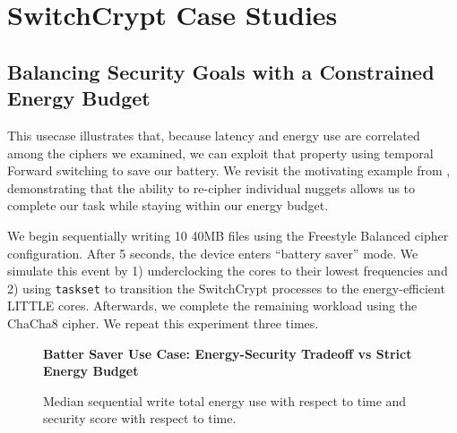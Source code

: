 \section{SwitchCrypt Case Studies}\label{sec:usecases}


\subsection{Balancing Security Goals with a Constrained Energy Budget}

This usecase illustrates that, because latency and energy use are correlated
among the ciphers we examined, we can exploit that property using temporal
Forward switching to save our battery. We revisit the motivating example from
, demonstrating that the ability to re-cipher individual
nuggets allows us to complete our task while staying within our energy budget.

We begin sequentially writing 10 40MB files using the Freestyle Balanced cipher
configuration. After 5 seconds, the device enters ``battery saver'' mode. We
simulate this event by 1) underclocking the cores to their lowest frequencies
and 2) using \texttt{taskset} to transition the SwitchCrypt processes to the
energy-efficient LITTLE cores. Afterwards, we complete the remaining workload
using the ChaCha8 cipher. We repeat this experiment three times.

\begin{figure}[ht] \textbf{Batter Saver Use Case: Energy-Security Tradeoff vs
   Strict Energy Budget}\par\medskip
   \centering
   {} \caption{Median sequential write total
   energy use with respect to time and security score with respect to time.}
  \label{fig:usecase-battery}
\end{figure}

